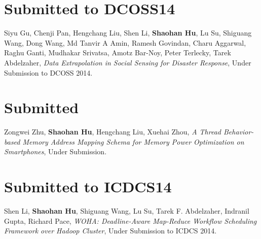 \section{\sc Submitted to DCOSS14}\hypertarget{gu2014dcoss}{}
Siyu Gu, Chenji Pan, Hengchang Liu, Shen Li, \textbf{Shaohan Hu}, Lu Su, Shiguang Wang, Dong Wang, Md Tanvir A Amin, Ramesh Govindan, Charu Aggarwal, Raghu Ganti, Mudhakar Srivatsa, Amotz Bar-Noy, Peter Terlecky, Tarek Abdelzaher, \emph{Data Extrapolation in Social Sensing for Disaster Response}, \textsf{Under Submission to DCOSS 2014}. %

\section{\sc Submitted}\hypertarget{zhu2014nossdav}{} Zongwei Zhu, \textbf{Shaohan Hu}, Hengchang Liu, Xuehai Zhou, \emph{A Thread Behavior-based Memory Address Mapping Schema for Memory Power Optimization on Smartphones}, \textsf{Under Submission}. %

\section{\sc Submitted to ICDCS14}\hypertarget{li2014moha}{}
Shen Li, \textbf{Shaohan Hu}, Shiguang Wang, Lu Su, Tarek F. Abdelzaher, Indranil Gupta, Richard Pace, \emph{WOHA: Deadline-Aware Map-Reduce Workflow Scheduling Framework over Hadoop Cluster}, \textsf{Under Submission to ICDCS 2014}. %


